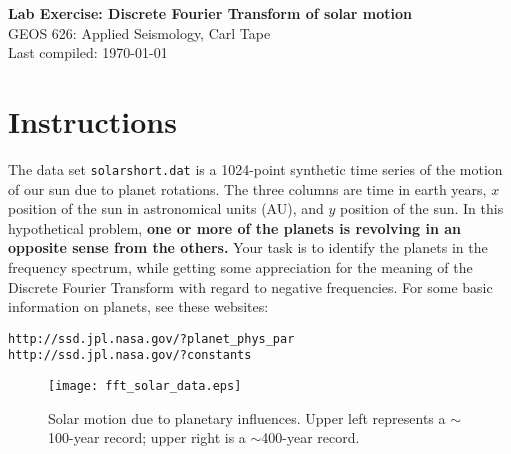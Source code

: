 \documentclass[11pt,titlepage,fleqn]{article}
\begin{document}

\begin{spacing}{1.2}
\centering
{\large \bf Lab Exercise: Discrete Fourier Transform of solar motion} \\
GEOS 626: Applied Seismology, Carl Tape \\
Last compiled: \today \\
\end{spacing}


\section*{Instructions}

The data set \verb+solarshort.dat+ is a 1024-point synthetic time series of the motion of our sun due to planet rotations. The three columns are time in earth years, $x$ position of the sun in astronomical units (AU), and $y$ position of the sun. In this hypothetical problem, {\bf one or more of the planets is revolving in an opposite sense from the others.} Your task is to identify the planets in the frequency spectrum, while getting some appreciation for the meaning of the Discrete Fourier Transform with regard to negative frequencies. For some basic information on planets, see these websites:
%
\begin{verbatim}
http://ssd.jpl.nasa.gov/?planet_phys_par
http://ssd.jpl.nasa.gov/?constants
\end{verbatim}

\begin{figure}[h]
\centering
\texttt{[image: fft\_solar\_data.eps]}
\caption[]
{{
Solar motion due to planetary influences. Upper left represents a $\sim$100-year record; upper right is a $\sim$400-year record.
\label{fig:solar}
}}
\end{figure}

\end{document}
